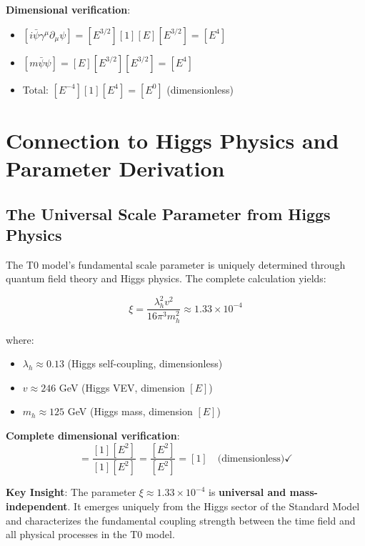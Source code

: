 \documentclass[12pt,a4paper]{article}
\theoremstyle{definition}
\theoremstyle{remark}
\begin{document}
	\textbf{Dimensional verification}:
	\begin{itemize}
		\item $[i\bar{\psi}\gamma^\mu\partial_\mu\psi] = [E^{3/2}][1][E][E^{3/2}] = [E^4]$
		\item $[m\bar{\psi}\psi] = [E][E^{3/2}][E^{3/2}] = [E^4]$
		\item Total: $[E^{-4}][1][E^4] = [E^0]$ (dimensionless) \checkmark
	\end{itemize}
	
	\section{Connection to Higgs Physics and Parameter Derivation}
	\label{sec:higgs_parameter_connection}
	
	\subsection{The Universal Scale Parameter from Higgs Physics}
	\label{subsec:universal_scale_parameter}
	
	The T0 model's fundamental scale parameter is uniquely determined through quantum field theory and Higgs physics. The complete calculation yields:
	
	\begin{equation}
		\boxed{\xi = \frac{\lambda_h^2 v^2}{16\pi^3 m_h^2} \approx 1.33 \times 10^{-4}}
		\label{eq:xi_higgs_universal}
	\end{equation}
	
	where:
	\begin{itemize}
		\item $\lambda_h \approx 0.13$ (Higgs self-coupling, dimensionless)
		\item $v \approx 246$ GeV (Higgs VEV, dimension $[E]$)
		\item $m_h \approx 125$ GeV (Higgs mass, dimension $[E]$)
	\end{itemize}
	
	\textbf{Complete dimensional verification}:
	\begin{equation}
		[\xi] = \frac{[1][E^2]}{[1][E^2]} = \frac{[E^2]}{[E^2]} = [1] \quad \text{(dimensionless)} \checkmark
	\end{equation}
	
	\begin{tcolorbox}[colback=green!5!white,colframe=green!75!black,title=Universal Scale Parameter]
		\textbf{Key Insight}: The parameter $\xi \approx 1.33 \times 10^{-4}$ is \textbf{universal and mass-independent}. It emerges uniquely from the Higgs sector of the Standard Model and characterizes the fundamental coupling strength between the time field and all physical processes in the T0 model.
	\end{tcolorbox}
	
\end{document}

